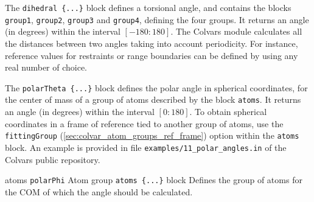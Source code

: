 
The \texttt{dihedral~\{...\}} block defines a torsional angle, and
contains the blocks \texttt{group1}, \texttt{group2}, \texttt{group3}
and \texttt{group4}, defining the four groups.  It returns an angle
(in degrees) within the interval $[-180:180]$.  The Colvars module
calculates all the distances between two angles taking into account
periodicity.  For instance, reference values for restraints or range
boundaries can be defined by using any real number of choice.

\begin{cvcoptions}
\item %
\item %
\item %
\item %
\item %
\item %
\end{cvcoptions}



The \texttt{polarTheta~\{...\}} block defines the polar angle in
spherical coordinates, for the center of mass of a group of atoms
described by the block \texttt{atoms}.  It returns an angle
(in degrees) within the interval $[0:180]$.
To obtain spherical coordinates in a frame of reference tied to
another group of atoms, use the \texttt{fittingGroup} (\ref{sec:colvar_atom_groups_ref_frame}) option
within the \texttt{atoms} block.
An example is provided in file \texttt{examples/11\_polar\_angles.in} of the Colvars public repository.

\begin{cvcoptions}
\item %
  \key
    {atoms}{%
    \texttt{polarPhi}}{%
    Atom group}{%
    \texttt{atoms~\{...\}} block}{%
    Defines the group of atoms for the COM of which the angle should be calculated.
    }
\end{cvcoptions}


